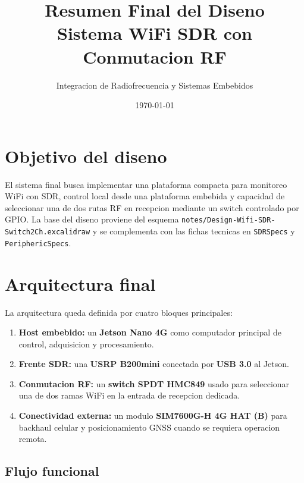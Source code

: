 \documentclass[11pt]{article}
\title{Resumen Final del Diseno\\Sistema WiFi SDR con Conmutacion RF}
\author{Integracion de Radiofrecuencia y Sistemas Embebidos}
\date{\today}
\begin{document}
\maketitle
\tableofcontents
\newpage

\section{Objetivo del diseno}

El sistema final busca implementar una plataforma compacta para monitoreo WiFi con SDR, control local desde una plataforma embebida y capacidad de seleccionar una de dos rutas RF en recepcion mediante un switch controlado por GPIO. La base del diseno proviene del esquema \texttt{notes/Design-Wifi-SDR-Switch2Ch.excalidraw} y se complementa con las fichas tecnicas en \texttt{SDRSpecs} y \texttt{PeriphericSpecs}.

\section{Arquitectura final}

La arquitectura queda definida por cuatro bloques principales:

\begin{enumerate}[leftmargin=*]
    \item \textbf{Host embebido:} un \textbf{Jetson Nano 4G} como computador principal de control, adquisicion y procesamiento.
    \item \textbf{Frente SDR:} una \textbf{USRP B200mini} conectada por \textbf{USB 3.0} al Jetson.
    \item \textbf{Conmutacion RF:} un \textbf{switch SPDT HMC849} usado para seleccionar una de dos ramas WiFi en la entrada de recepcion dedicada.
    \item \textbf{Conectividad externa:} un modulo \textbf{SIM7600G-H 4G HAT (B)} para backhaul celular y posicionamiento GNSS cuando se requiera operacion remota.
\end{enumerate}

\subsection{Flujo funcional}
\end{document}
